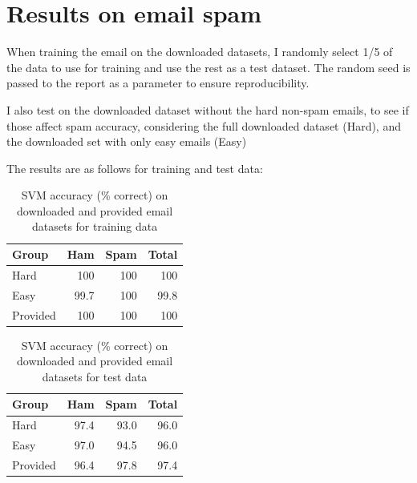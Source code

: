 \documentclass[]{article}
\begin{document}
\section{Results on email spam}
When training the email on the downloaded datasets, I randomly select 1/5 of the data to use for training and use the rest as a test dataset. The random seed is passed to the report as a parameter to ensure reproducibility.

I also test on the downloaded dataset without the hard non-spam emails, to see if those affect spam accuracy, considering the full downloaded dataset (Hard), and the downloaded set with only easy emails (Easy)

The results are as follows for training and test data:

\begin{table}[H]
	\begin{center}
		\caption{SVM accuracy (\% correct) on downloaded and provided email datasets for training data}
		\label{tab:table1}
		\begin{tabular}{|lr|r|r} %
			\textbf{Group} & \textbf{Ham} & \textbf{Spam} & \textbf{Total}\\
			\hline
			Hard & 100 & 100 & 100 \\
			Easy & 99.7 & 100 & 99.8 \\
			Provided & 100 & 100 & 100 \\
		\end{tabular}
	\end{center}
\end{table}

\begin{table}[H]
\begin{center}
	\caption{SVM accuracy (\% correct) on downloaded and provided email datasets for test data}
	\label{tab:table1}
	\begin{tabular}{|lr|r|r} %
		\textbf{Group} & \textbf{Ham} & \textbf{Spam} & \textbf{Total}\\
		\hline
		Hard & 97.4 & 93.0 & 96.0 \\
		Easy & 97.0 & 94.5 & 96.0 \\
		Provided & 96.4 & 97.8 & 97.4 \\
	\end{tabular}
\end{center}
\end{table}
\end{document}

